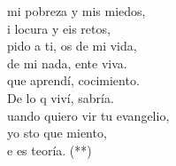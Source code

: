 \begin{cancion}
\begin{chorus}
	mi pobreza y  mis miedos, \\
	i locura y eis retos,\\
	pido a ti, os de mi vida, \\
	 de mi nada, ente viva.\\
	que aprendí, cocimiento. \\
	De lo q viví, sabría.\\
	uando quiero vir tu evangelio, \\
	yo sto que miento,\\
	e es teoría. (**)\\
	\end{chorus}%
	\jump\\
\end{cancion}%
